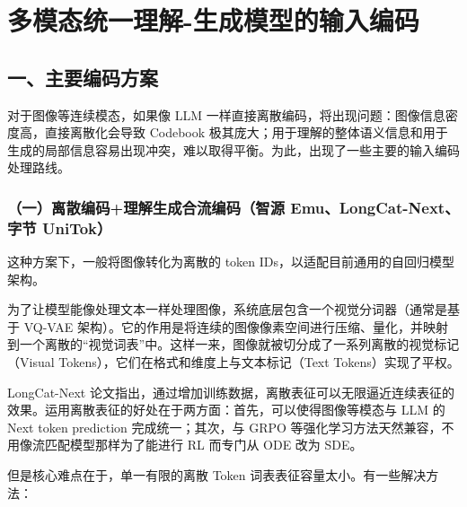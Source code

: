 \setcounter{section}{0}

\hypertarget{ux591aux6a21ux6001ux7edfux4e00ux7406ux89e3-ux751fux6210ux6a21ux578bux7684ux8f93ux5165ux7f16ux7801}{%
\section{多模态统一理解-生成模型的输入编码}\label{ux591aux6a21ux6001ux7edfux4e00ux7406ux89e3-ux751fux6210ux6a21ux578bux7684ux8f93ux5165ux7f16ux7801}}

\hypertarget{ux4e00ux4e3bux8981ux7f16ux7801ux65b9ux6848}{%
\subsection{一、主要编码方案}\label{ux4e00ux4e3bux8981ux7f16ux7801ux65b9ux6848}}

对于图像等连续模态，如果像 LLM 一样直接离散编码，将出现问题：图像信息密度高，直接离散化会导致 Codebook 极其庞大；用于理解的整体语义信息和用于生成的局部信息容易出现冲突，难以取得平衡。为此，出现了一些主要的输入编码处理路线。

\hypertarget{ux4e00ux79bbux6563ux7f16ux7801ux7406ux89e3ux751fux6210ux5408ux6d41ux7f16ux7801ux667aux6e90-emulongcat-nextux5b57ux8282-unitok}{%
\subsubsection{（一）离散编码+理解生成合流编码（智源 Emu、LongCat-Next、字节 UniTok）}\label{ux4e00ux79bbux6563ux7f16ux7801ux7406ux89e3ux751fux6210ux5408ux6d41ux7f16ux7801ux667aux6e90-emulongcat-nextux5b57ux8282-unitok}}

这种方案下，一般将图像转化为离散的 token IDs，以适配目前通用的自回归模型架构。

为了让模型能像处理文本一样处理图像，系统底层包含一个视觉分词器（通常是基于 VQ-VAE 架构）。它的作用是将连续的图像像素空间进行压缩、量化，并映射到一个离散的``视觉词表''中。这样一来，图像就被切分成了一系列离散的视觉标记（Visual Tokens），它们在格式和维度上与文本标记（Text Tokens）实现了平权。

LongCat-Next 论文指出，通过增加训练数据，离散表征可以无限逼近连续表征的效果。运用离散表征的好处在于两方面：首先，可以使得图像等模态与 LLM 的 Next token prediction 完成统一；其次，与 GRPO 等强化学习方法天然兼容，不用像流匹配模型那样为了能进行 RL 而专门从 ODE 改为 SDE。

但是核心难点在于，单一有限的离散 Token 词表表征容量太小。有一些解决方法：

